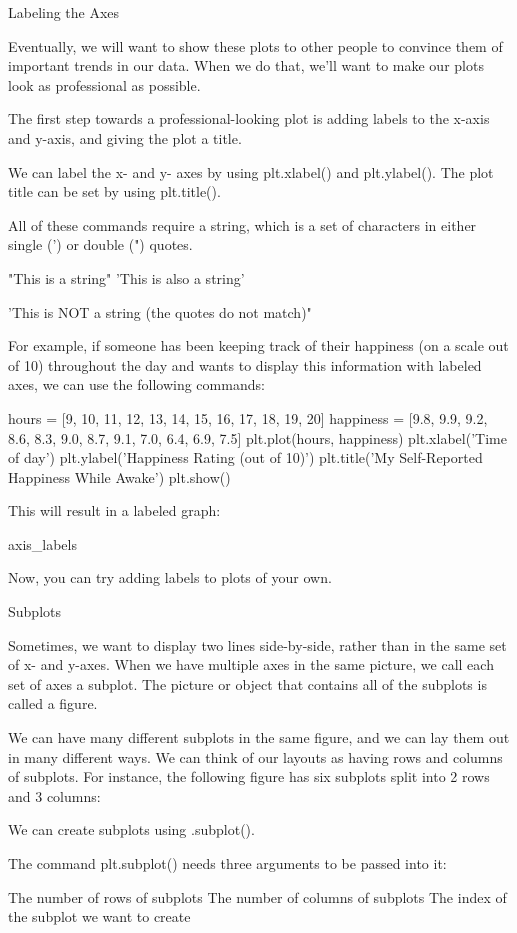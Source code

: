 \documentclass{journal}
\begin{document}
Labeling the Axes

Eventually, we will want to show these plots to other people to convince them of important trends in our data. When we do that, we’ll want to make our plots look as professional as possible.

The first step towards a professional-looking plot is adding labels to the x-axis and y-axis, and giving the plot a title.

We can label the x- and y- axes by using plt.xlabel() and plt.ylabel(). The plot title can be set by using plt.title().

All of these commands require a string, which is a set of characters in either single (') or double (") quotes.

"This is a string"
'This is also a string'

'This is NOT a string (the quotes do not match)"

For example, if someone has been keeping track of their happiness (on a scale out of 10) throughout the day and wants to display this information with labeled axes, we can use the following commands:

hours = [9, 10, 11, 12, 13, 14, 15, 16, 17, 18, 19, 20]
happiness = [9.8, 9.9, 9.2, 8.6, 8.3, 9.0, 8.7, 9.1, 7.0, 6.4, 6.9, 7.5]
plt.plot(hours, happiness)
plt.xlabel('Time of day')
plt.ylabel('Happiness Rating (out of 10)')
plt.title('My Self-Reported Happiness While Awake')
plt.show()

This will result in a labeled graph:

axis_labels

Now, you can try adding labels to plots of your own.


Subplots

Sometimes, we want to display two lines side-by-side, rather than in the same set of x- and y-axes. When we have multiple axes in the same picture, we call each set of axes a subplot. The picture or object that contains all of the subplots is called a figure.

We can have many different subplots in the same figure, and we can lay them out in many different ways. We can think of our layouts as having rows and columns of subplots. For instance, the following figure has six subplots split into 2 rows and 3 columns:

We can create subplots using .subplot().

The command plt.subplot() needs three arguments to be passed into it:

    The number of rows of subplots
    The number of columns of subplots
    The index of the subplot we want to create
\end{document}
